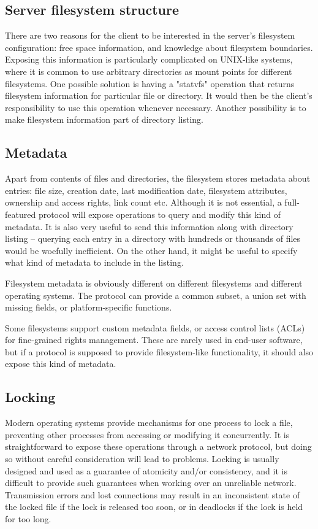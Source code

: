 \subsection{Server filesystem structure}

There are two reasons for the client to be interested in the server's filesystem configuration: free space
information, and knowledge about filesystem boundaries. Exposing this information is particularly complicated
on UNIX-like systems, where it is common to use arbitrary directories as mount points for different
filesystems. One possible solution is having a "statvfs"\cite{statvfs} operation that returns filesystem
information for particular file or directory. It would then be the client's responsibility to use this
operation whenever necessary. Another possibility is to make filesystem information part of directory listing.

\subsection{Metadata}

Apart from contents of files and directories, the filesystem stores metadata about entries: file size,
creation date, last modification date, filesystem attributes, ownership and access rights, link count etc.
Although it is not essential, a full-featured protocol will expose operations to query and modify this kind of
metadata. It is also very useful to send this information along with directory listing -- querying each entry
in a directory with hundreds or thousands of files would be woefully inefficient. On the other hand, it might
be useful to specify what kind of metadata to include in the listing.

Filesystem metadata is obviously different on different filesystems and different operating systems. The
protocol can provide a common subset, a union set with missing fields, or platform-specific functions.

Some filesystems support custom metadata fields, or access control lists (ACLs) for fine-grained rights
management. These are rarely used in end-user software, but if a protocol is supposed to provide
filesystem-like functionality, it should also expose this kind of metadata.

\subsection{Locking}

Modern operating systems provide mechanisms for one process to lock a file, preventing other processes from
accessing or modifying it concurrently. It is straightforward to expose these operations through a network
protocol, but doing so without careful consideration will lead to problems. Locking is usually designed and
used as a guarantee of atomicity and/or consistency, and it is difficult to provide such guarantees when
working over an unreliable network. Transmission errors and lost connections may result in an inconsistent
state of the locked file if the lock is released too soon, or in deadlocks if the lock is held for too long.

